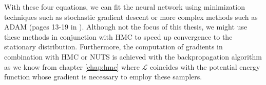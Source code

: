 With these four equations, we can fit the neural network using minimization techniques such as stochastic gradient descent or more complex methods such as ADAM (pages 13-19 in \cite{ml_for_physicists}). 
Although not the focus of this thesis, we might use these methods in conjunction with HMC to speed up convergence to the stationary distribution. Furthermore, the computation of gradients in combination with
HMC or NUTS is achieved with the backpropagation algorithm as we know from chapter \ref{chap:hmc} where $\mathcal{L}$ coincides with the potential energy function whose gradient is necessary to employ these samplers.
\begin{comment}

\subsection{Loss Function for Regression}
In this thesis, we are concerned with regression tasks. The activation function of the final layer $\sigma_L$ is then just the identity function. The typical loss function chosen to solve regression tasks is the $L_2$-norm, which for a single output can be written as 
\begin{equation}
    \mathcal{L}(y, \hat{y}) = \frac{1}{2}\norm{y-\hat{y}}_2^2,
\end{equation}
where $\hat{y}$ denotes the model output and $y$ the ground-truth. Now, the model output in this case is $\hat{y}_j = a_j^L = z_j^L$. Therefore, 
\begin{equation}
    \Delta_j^L = \pdv{\mathcal{L}}{z_j^L} = a_j^L - y_j.
\end{equation} 

\end{comment}

